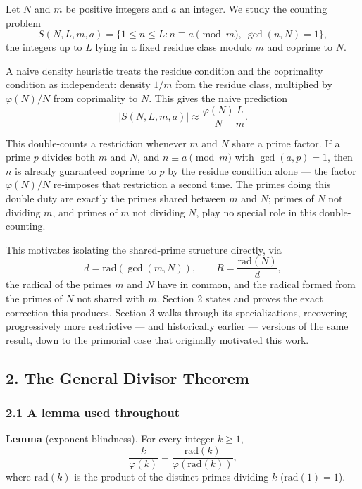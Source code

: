 \documentclass[
]{article}
\begin{document}
Let \(N\) and \(m\) be positive integers and \(a\) an integer. We study
the counting problem \[
S(N,L,m,a) = \{1\le n\le L : n\equiv a\pmod m,\ \gcd(n,N)=1\},
\] the integers up to \(L\) lying in a fixed residue class modulo \(m\)
and coprime to \(N\).

A naive density heuristic treats the residue condition and the
coprimality condition as independent: density \(1/m\) from the residue
class, multiplied by \(\varphi(N)/N\) from coprimality to \(N\). This
gives the naive prediction \[
|S(N,L,m,a)| \approx \frac{\varphi(N)}{N}\frac{L}{m}.
\]

This double-counts a restriction whenever \(m\) and \(N\) share a prime
factor. If a prime \(p\) divides both \(m\) and \(N\), and
\(n\equiv a\pmod m\) with \(\gcd(a,p)=1\), then \(n\) is already
guaranteed coprime to \(p\) by the residue condition alone --- the
factor \(\varphi(N)/N\) re-imposes that restriction a second time. The
primes doing this double duty are exactly the primes shared between
\(m\) and \(N\); primes of \(N\) not dividing \(m\), and primes of \(m\)
not dividing \(N\), play no special role in this double-counting.

This motivates isolating the shared-prime structure directly, via \[
d=\mathrm{rad}(\gcd(m,N)), \qquad R=\frac{\mathrm{rad}(N)}{d},
\] the radical of the primes \(m\) and \(N\) have in common, and the
radical formed from the primes of \(N\) not shared with \(m\). Section 2
states and proves the exact correction this produces. Section 3 walks
through its specializations, recovering progressively more restrictive
--- and historically earlier --- versions of the same result, down to
the primorial case that originally motivated this work.

\subsection{2. The General Divisor
Theorem}\label{the-general-divisor-theorem}

\subsubsection{2.1 A lemma used
throughout}\label{a-lemma-used-throughout}

\textbf{Lemma} (exponent-blindness). For every integer \(k\ge1\), \[
\frac{k}{\varphi(k)} = \frac{\mathrm{rad}(k)}{\varphi(\mathrm{rad}(k))},
\] where \(\mathrm{rad}(k)\) is the product of the distinct primes
dividing \(k\) (\(\mathrm{rad}(1)=1\)).
\end{document}
